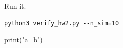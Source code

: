 \documentclass[solutions=false]{akizumi-hw}
\begin{document}
\begin{problem}
Run it.
\begin{solution}
\begin{verbatim}
python3 verify_hw2.py --n_sim=10
\end{verbatim}
\begin{codeblock}[lang=python]
print("a_b")
\end{codeblock}
\end{solution}
\end{problem}
\end{document}
